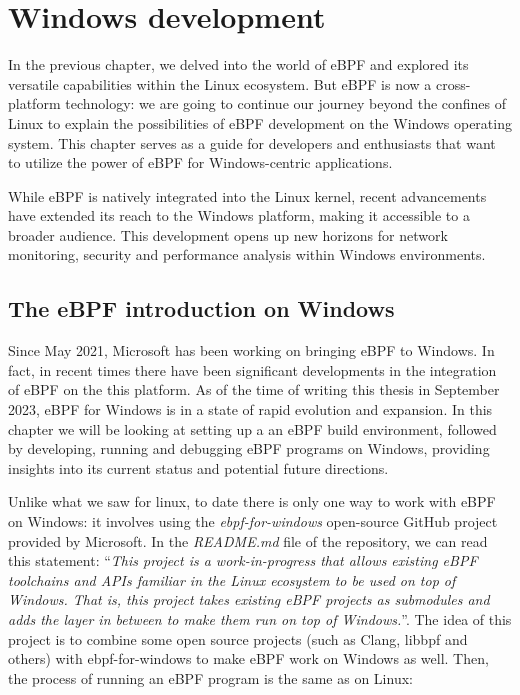 \chapter{Windows development}

In the previous chapter, we delved into the world of eBPF and explored its versatile capabilities within the Linux ecosystem.
But eBPF is now a cross-platform technology: we are going to continue our journey beyond the confines of Linux to explain the possibilities of eBPF development on the Windows operating system. 
This chapter serves as a guide for developers and enthusiasts that want to utilize the power of eBPF for Windows-centric applications.

While eBPF is natively integrated into the Linux kernel, recent advancements have extended its reach to the Windows platform, making it accessible to a broader audience. 
This development opens up new horizons for network monitoring, security and performance analysis within Windows environments.

\section{The eBPF introduction on Windows}

Since May 2021, Microsoft has been working on bringing eBPF to Windows. 
In fact, in recent times there have been significant developments in the integration of eBPF on the this platform. 
As of the time of writing this thesis in September 2023, eBPF for Windows is in a state of rapid evolution and expansion. 
In this chapter we will be looking at setting up a an eBPF build environment, followed by developing, running and debugging eBPF programs on Windows, providing insights into its current status and potential future directions. 

Unlike what we saw for linux, to date there is only one way to work with eBPF on Windows: it involves using the \textit{ebpf-for-windows} \cite{eBPFWinGitHubRepo} open-source GitHub project provided by Microsoft.
In the \textit{README.md} file of the repository, we can read this statement: 
``\textit{This project is a work-in-progress that allows existing eBPF toolchains and APIs familiar in the Linux ecosystem to be used on top of Windows. 
That is, this project takes existing eBPF projects as submodules and adds the layer in between to make them run on top of Windows.}''.
The idea of this project is to combine some open source projects (such as Clang, libbpf and others) with ebpf-for-windows to make eBPF work on Windows as well.
Then, the process of running an eBPF program is the same as on Linux:

